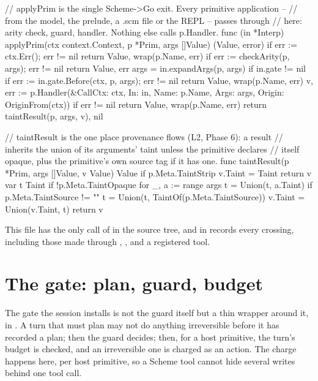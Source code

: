 \begin{go}
// applyPrim is the single Scheme->Go exit. Every primitive application --
// from the model, the prelude, a .scm file or the REPL -- passes through
// here: arity check, guard, handler. Nothing else calls p.Handler.
func (in *Interp) applyPrim(ctx context.Context, p *Prim, args []Value) (Value, error) {
    if err := ctx.Err(); err != nil {
        return Value{}, wrap(p.Name, err)
    }
    if err := checkArity(p, args); err != nil {
        return Value{}, err
    }
    args = in.expandArgs(p, args)
    if in.gate != nil {
        if err := in.gate.Before(ctx, p, args); err != nil {
            return Value{}, wrap(p.Name, err)
        }
    }
    v, err := p.Handler(&Call{Ctx: ctx, In: in, Name: p.Name, Args: args, Origin: OriginFrom(ctx)})
    if err != nil {
        return Value{}, wrap(p.Name, err)
    }
    return taintResult(p, args, v), nil
}

// taintResult is the one place provenance flows (L2, Phase 6): a result
// inherits the union of its arguments' taint unless the primitive declares
// itself opaque, plus the primitive's own source tag if it has one.
func taintResult(p *Prim, args []Value, v Value) Value {
    if p.Meta.TaintStrip {
        v.Taint = Taint{}
        return v
    }
    var t Taint
    if !p.Meta.TaintOpaque {
        for _, a := range args {
            t = Union(t, a.Taint)
        }
    }
    if p.Meta.TaintSource != "" {
        t = Union(t, TaintOf(p.Meta.TaintSource))
    }
    v.Taint = Union(v.Taint, t)
    return v
}
\end{go}

This file has the only call of  in the source tree, and
 in  records every
crossing, including those made through , ,
 and a registered tool.

\section{The gate: plan, guard, budget}

The gate the session installs is not the guard itself but a thin wrapper
around it, in . A turn that must plan may not
do anything irreversible before it has recorded a plan; then the guard
decides; then, for a host primitive, the turn's budget is checked, and an
irreversible one is charged as an action. The charge happens here, per
host primitive, so a Scheme tool cannot hide several writes behind one
tool call.

